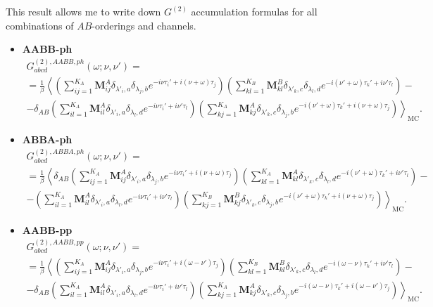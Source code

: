 \documentclass[a4paper,12pt]{article}
\renewcommand{\t}{\ensuremath{\tau}}
\newcommand{\w}{\ensuremath{\omega}}
\begin{document}
This result allows me to write down $G^{(2)}$ accumulation formulas for all combinations
of $AB$-orderings and channels.

\begin{itemize}
	\item \textbf{AABB-ph}
	\begin{multline}
		G^{(2),AABB,ph}_{abcd}(\w;\nu,\nu') =\\= \frac{1}{\beta}\left\langle
			\left(\sum_{ij=1}^{K_A} \mathbf{M}^A_{ij}
				\delta_{\lambda'_i,a} \delta_{\lambda_j,b}
				e^{-i\nu\t_i'+i(\nu+\w)\t_j}
			\right)
			\left(\sum_{kl=1}^{K_B} \mathbf{M}^B_{kl}
				\delta_{\lambda'_k,c} \delta_{\lambda_l,d}
				e^{-i(\nu'+\w)\t_k'+i\nu'\t_l}
			\right) -\right.\\\left.-\delta_{AB}
			\left(\sum_{il=1}^{K_A} \mathbf{M}^A_{il}
				\delta_{\lambda'_i,a} \delta_{\lambda_l,d}
				e^{-i\nu\t_i'+i\nu'\t_l}
			\right)
			\left(\sum_{kj=1}^{K_A} \mathbf{M}^A_{kj}
				\delta_{\lambda'_k,c} \delta_{\lambda_j,b}
				e^{-i(\nu'+\w)\t_k'+i(\nu+\w)\t_j}
			\right)
		\right\rangle_\mathrm{MC}.
	\end{multline}

	\item \textbf{ABBA-ph}
	\begin{multline}
		G^{(2),ABBA,ph}_{abcd}(\w;\nu,\nu') =\\= \frac{1}{\beta}\left\langle
			\delta_{AB}
			\left(\sum_{ij=1}^{K_A} \mathbf{M}^A_{ij}
				\delta_{\lambda'_i,a} \delta_{\lambda_j,b}
				e^{-i\nu\t_i'+i(\nu+\w)\t_j}
			\right)
			\left(\sum_{kl=1}^{K_A} \mathbf{M}^A_{kl}
				\delta_{\lambda'_k,c} \delta_{\lambda_l,d}
				e^{-i(\nu'+\w)\t_k'+i\nu'\t_l}
			\right) -\right.\\\left.-
			\left(\sum_{il=1}^{K_A} \mathbf{M}^A_{il}
				\delta_{\lambda'_i,a} \delta_{\lambda_l,d}
				e^{-i\nu\t_i'+i\nu'\t_l}
			\right)
			\left(\sum_{kj=1}^{K_B} \mathbf{M}^B_{kj}
				\delta_{\lambda'_k,c} \delta_{\lambda_j,b}
				e^{-i(\nu'+\w)\t_k'+i(\nu+\w)\t_j}
			\right)
			\right\rangle_\mathrm{MC}.
	\end{multline}

	\item \textbf{AABB-pp}
	\begin{multline}
	G^{(2),AABB,pp}_{abcd}(\w;\nu,\nu') =\\= \frac{1}{\beta}\left\langle
		\left(\sum_{ij=1}^{K_A} \mathbf{M}^A_{ij}
			\delta_{\lambda'_i,a} \delta_{\lambda_j,b}
			e^{-i\nu\t_i'+i(\w-\nu')\t_j}
		\right)
		\left(\sum_{kl=1}^{K_B} \mathbf{M}^B_{kl}
			\delta_{\lambda'_k,c} \delta_{\lambda_l,d}
			e^{-i(\w-\nu)\t_k'+i\nu'\t_l}
		\right) -\right.\\\left.-\delta_{AB}
		\left(\sum_{il=1}^{K_A} \mathbf{M}^A_{il}
			\delta_{\lambda'_i,a} \delta_{\lambda_l,d}
			e^{-i\nu\t_i'+i\nu'\t_l}
		\right)
		\left(\sum_{kj=1}^{K_A} \mathbf{M}^A_{kj}
			\delta_{\lambda'_k,c} \delta_{\lambda_j,b}
			e^{-i(\w-\nu)\t_k'+i(\w-\nu')\t_j}
		\right)
		\right\rangle_\mathrm{MC}.
	\end{multline}


\end{itemize}
\end{document}
